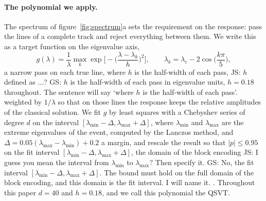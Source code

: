 \documentclass[11pt,a4paper]{article}
\newcommand{\js}[1]{{\color{blue} JS: #1 }}
\newcommand{\gs}[1]{{\color{orange!85!black} GS: #1 }}
\begin{document}
\paragraph{The polynomial we apply.}
The spectrum of figure~\ref{fig:spectrum}a sets the requirement on the response: pass the lines of a
complete track and reject everything between them. We write this as a target function on the
eigenvalue axis,
\begin{equation}
g(\lambda)=\frac{1}{\lambda}\max_{k}\exp\!\Big[-\Big(\frac{\lambda-\lambda_k}{h}\Big)^2\Big],\qquad
\lambda_k=\lambda_c-2\cos\!\Big(\frac{k\pi}{5}\Big),
\end{equation}
a narrow pass on each true line, where $h$ is the half-width of each pass, \js{$h$ defined as ...?} \gs{$h$ is the half-width of each pass in eigenvalue units, $h=0.18$ throughout. The sentence will say `where $h$ is the half-width of each pass'.  } weighted by $1/\lambda$ so that on those lines
the response keeps the relative amplitudes of the classical solution. We fit $g$ by least squares
with a Chebyshev series of degree $d$ on the interval $[\lambda_{\min}-\Delta,\lambda_{\max}+\Delta]$,
where $\lambda_{\min}$ and $\lambda_{\max}$ are the extreme eigenvalues of the event, computed by the
Lanczos method, and
$\Delta=0.05(\lambda_{\max}-\lambda_{\min})+0.2$ a margin, and rescale the result so that
$|p|\le0.95$ on the fit interval $[\lambda_{\min}-\Delta,\lambda_{\max}+\Delta]$, the domain of the
block encoding \js{I guess you mean the interval from $\lambda_{\min}$ to $\lambda_{\max}$? Then specify it. } \gs{No, the fit interval $[\lambda_{\min}-\Delta,\lambda_{\max}+\Delta]$. The bound must hold on the full domain of the block encoding, and this domain is the fit interval. I will name it.  }. Throughout this paper $d=40$ and $h=0.18$, and we call this
polynomial the QSVT.
\end{document}
